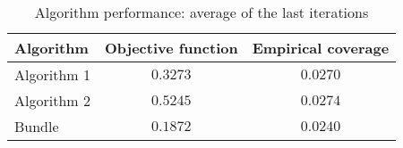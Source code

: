 \begin{table}[ht]
    \centering
    \begin{tabular}{lcc}
    \toprule
    \textbf{Algorithm} & \textbf{Objective function} & \textbf{Empirical coverage} \\
    \midrule
    Algorithm 1 & $0.3273$ & $0.0270$ \\
Algorithm 2 & $0.5245$ & $0.0274$ \\
Bundle & $0.1872$ & $0.0240$ \\
\bottomrule
    \end{tabular}
    \caption{Algorithm performance: average of the last iterations}
    \end{table}